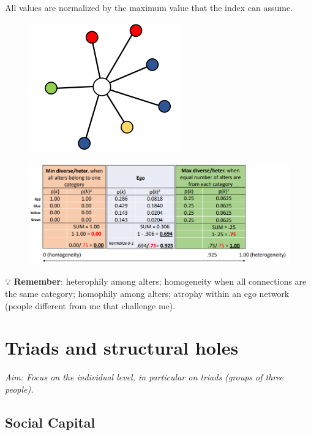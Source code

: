 \documentclass[
  notitlepage,
  onecolumn,
  openany]{book}
\begin{document}
All values are normalized by the maximum value that the index can assume.

\begin{figure}[h!]

{\centering \includegraphics[width=0.3\linewidth]{images/06-Attributes based measures/Untitled 5} 

}

\end{figure}

\begin{figure}[h!]

{\centering \includegraphics[width=0.8\linewidth]{images/06-Attributes based measures/Untitled 6} 

}

\end{figure}

💡 \textbf{Remember}:
heterophily among alters;
homogeneity when all connections are the same category;
homophily among alters;
atrophy within an ego network (people different from me that challenge me).

\hypertarget{triads-and-structural-holes}{%
\chapter{Triads and structural holes}\label{triads-and-structural-holes}}

\emph{Aim: Focus on the individual level, in particular on triads (groups of three people).}

\hypertarget{social-capital}{%
\section{Social Capital}\label{social-capital}}
\end{document}
